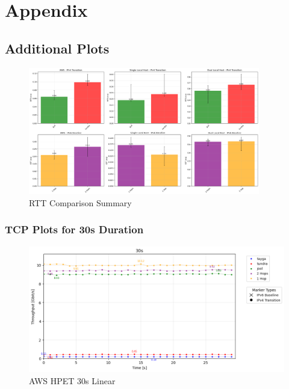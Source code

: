 \appendix
{}
\chapter*{Appendix}
\printbibliography
\newpage

\section*{Additional Plots}
\begin{figure}[H]
    \centering
    \includegraphics[width=0.9\textwidth]{resources/finalPlots/appendix/rtt_comparison_summary.png}
    \caption{RTT Comparison Summary}
    \label{fig:rtt_comparison_summary}
\end{figure}

\subsection*{TCP Plots for 30s Duration}

\begin{figure}[H]
    \centering
    \includegraphics[width=1\textwidth]{resources/finalPlots/appendix/combined/AWS_tcp_sameScale_hpet_30s_linear.png}
    \caption{AWS HPET 30s Linear}
    \label{fig:aws_tcp_hpet_30s_linear}
\end{figure}



